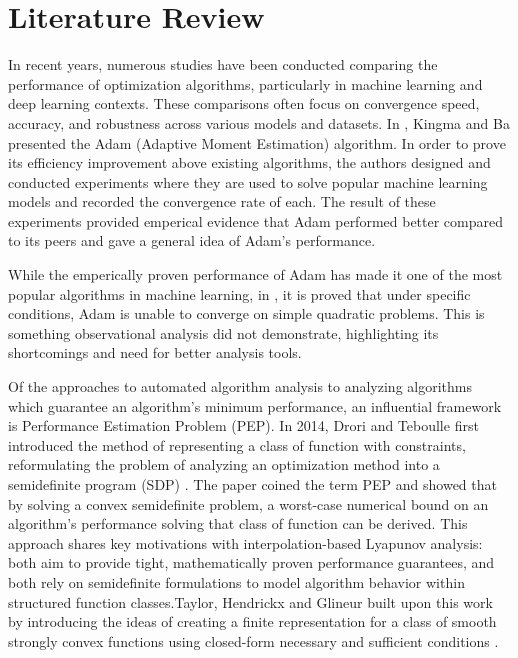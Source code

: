 \chapter{Literature Review}\label{chapter:literature}

In recent years, numerous studies have been conducted comparing the performance of optimization algorithms, particularly in machine learning and deep learning contexts. These comparisons often focus on convergence speed, accuracy, and robustness across various models and datasets. In \cite{adam}, Kingma and Ba presented the Adam (Adaptive Moment Estimation) algorithm. In order to prove its efficiency improvement above existing algorithms, the authors designed and conducted experiments where they are used to solve popular machine learning models and recorded the convergence rate of each. The result of these experiments provided emperical evidence that Adam performed better compared to its peers and gave a general idea of Adam's performance.

While the emperically proven performance of Adam has made it one of the most popular algorithms in machine learning, in \cite{adam2}, it is proved that under specific conditions, Adam is unable to converge on simple quadratic problems. This is something observational analysis did not demonstrate, highlighting its shortcomings and need for better analysis tools.

Of the approaches to automated algorithm analysis to analyzing algorithms which guarantee an algorithm's minimum performance, an influential framework is Performance Estimation Problem (PEP). In 2014, Drori and Teboulle first introduced the method of representing a class of function with constraints, reformulating the problem of analyzing an optimization method into a semidefinite program (SDP) \cite{drori2012}. The paper coined the term PEP and showed that by solving a convex semidefinite problem, a worst-case numerical bound on an algorithm's performance solving that class of function can be derived. This approach shares key motivations with interpolation-based Lyapunov analysis: both aim to provide tight, mathematically proven performance guarantees, and both rely on semidefinite formulations to model algorithm behavior within structured function classes.Taylor, Hendrickx and Glineur built upon this work by introducing the ideas of creating a finite representation for a class of smooth strongly convex functions using closed-form necessary and sufficient conditions \cite{pepit}.

